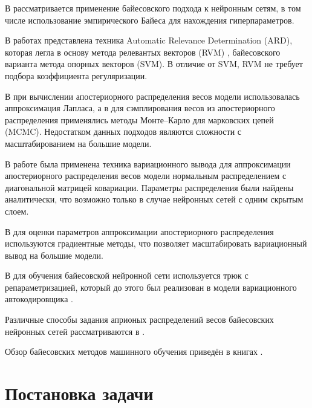 \documentclass{article}
\numberwithin{equation}{section}
\begin{document}
    В \cite{mackay_1992a, mackay_1992b, mackay_1992c}
    рассматривается применение байесовского подхода к нейронным сетям,
    в том числе использование эмпирического Байеса
    для нахождения гиперпараметров.

    В работах \cite{mackay_1994, mackay_1995, nea_96}
    представлена техника Automatic Relevance Determination (ARD),
    которая легла в основу метода релевантых векторов (RVM) \cite{tipping_01},
    байесовского варианта метода опорных векторов (SVM).
    В отличие от SVM, RVM не требует подбора коэффициента регуляризации.

    В \cite{mackay_1992a, mackay_1992b, mackay_1992c, mackay_1994, mackay_1995}
    при вычислении апостериорного распределения весов модели использовалась
    аппроксимация Лапласа, а в \cite{nea_96} для сэмплирования весов
    из апостериорного распределения применялись методы
    Монте--Карло для марковских цепей (MCMC).
    Недостатком данных подходов являются сложности с масштабированием на большие модели.

    В работе \cite{hinton_van_camp_1993} была применена техника вариационного вывода
    для аппроксимации апостериорного распределения весов модели
    нормальным распределением с диагональной матрицей ковариации.
    Параметры распределения были найдены аналитически,
    что возможно только в случае нейронных сетей
    с одним скрытым слоем.

    В \cite{gra_11} для оценки параметров аппроксимации апостериорного распределения
    используются градиентные методы, что позволяет масштабировать вариационный вывод
    на большие модели.

    В \cite{blu_15} для обучения байесовской нейронной сети
    используется трюк с репараметризацией, который до этого был реализован в модели
    вариационного автокодировщика \cite{kingma_2013}.

    Различные способы задания априоных распределений весов
    байесовских нейронных сетей рассматриваются в
    \cite{nal_18, wi_20, hoe_21, for_22}.

    Обзор байесовских методов машинного обучения приведён в книгах
    \cite{bishop2006, murphy_book_1, murphy_book_2}.

    \section{Постановка задачи}
\end{document}
